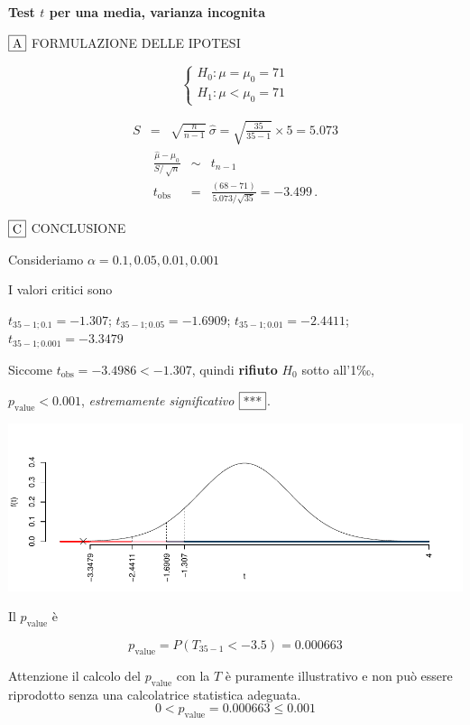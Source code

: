 \documentclass[
  11pt,
]{book}
\theoremstyle{mytheoremstyle}
\theoremstyle{mydefstyle}
\newenvironment{sol}
  {
  \begin{tcolorbox}[enhanced,breakable,arc=0.1mm,boxrule=1pt,colback=white,colframe=iblue,
  title=\bf \fontfamily{lmss}\selectfont \hspace{.5 cm} Soluzione,drop fuzzy shadow]

}{
\end{tcolorbox}
  }
\begin{document}
\begin{sol}
\textbf{Test \(t\) per una media, varianza incognita}

\(\fbox{A}\) FORMULAZIONE DELLE IPOTESI

\[\begin{cases}
   H_0: \mu = \mu_0=71 \\
   H_1: \mu < \mu_0=71 
   \end{cases}\]

\begin{eqnarray*}
   S    &=& \sqrt{\frac{n} {n-1}}\ \widehat{\sigma} 
   =  \sqrt{\frac{ 35 } { 35 -1}} \times  5  =  5.073 
   \end{eqnarray*}
\begin{eqnarray*}
   \frac{\hat\mu - \mu_{0}} {S/\,\sqrt{n}}&\sim&t_{n-1}\\
   t_{\text{obs}}
   &=& \frac{ ( 68 -  71 )} { 5.073 /\sqrt{ 35 }}
   =   -3.499 \, .
   \end{eqnarray*}

\(\fbox{C}\) CONCLUSIONE

Consideriamo \(\alpha=0.1, 0.05, 0.01, 0.001\)

I valori critici sono

\(t_{35-1;0.1}=-1.307\); \(t_{35-1;0.05}=-1.6909\); \(t_{35-1;0.01}=-2.4411\); \(t_{35-1;0.001}=-3.3479\)

Siccome \(t_\text{obs}=-3.4986<-1.307\), quindi \textbf{rifiuto} \(H_0\) sotto all'1‰,

\(p_\text{value}<0.001\), \emph{estremamente significativo} \(\fbox{***}\).

\begin{center}\includegraphics{Esami_passati_con_soluzioni_files/figure-latex/2023-13,-1} \end{center}

Il \(p_{\text{value}}\) è

\[ p_{\text{value}} = P(T_{35-1}<-3.5)=0.000663 \]

Attenzione il calcolo del \(p_\text{value}\) con la \(T\) è puramente illustrativo e non può essere riprodotto senza una calcolatrice statistica adeguata.\[
 0 < p_\text{value}= 0.000663 \leq 0.001 
\]

\end{sol}
\end{document}
